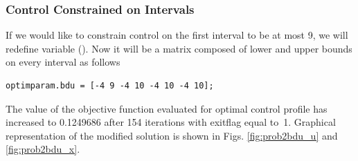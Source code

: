 \subsubsection{Control Constrained on Intervals}
If we would like to constrain control on the first interval to be at
most 9, we will redefine variable 
().  Now it will be a matrix composed
of lower and upper bounds on every interval as follows
\begin{verbatim}
optimparam.bdu = [-4 9 -4 10 -4 10 -4 10]; 
\end{verbatim}

The value of the objective function evaluated for optimal control
profile has increased to 0.1249686 after 154 iterations with exitflag
equal to~1. Graphical representation of the modified solution is shown
in Figs. \ref{fig:prob2bdu_u} and \ref{fig:prob2bdu_x}.

